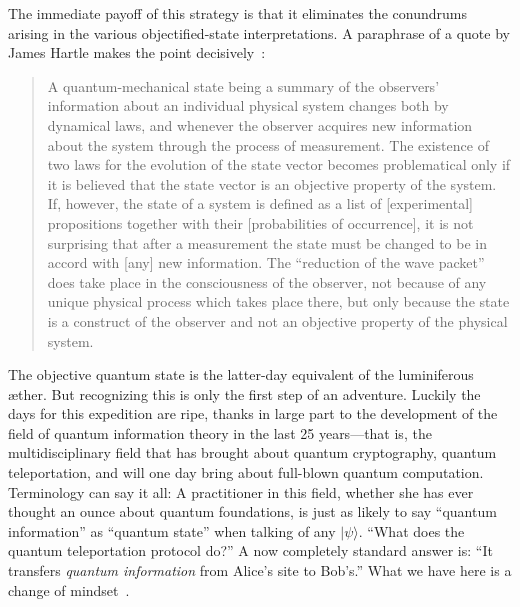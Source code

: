\documentclass[aps,pra,superscriptaddress,12pt,tightenlines,nofootinbib]{revtex4-2}
\begin{document}
The immediate payoff of this strategy is that it eliminates the conundrums arising in the various objectified-state interpretations.  A paraphrase of a quote by James Hartle makes the point decisively~\cite{Hartle68}:
\begin{quote}
\noindent A quantum-mechanical state being a summary of the observers' information about an individual physical system changes both by
dynamical laws, and whenever the observer acquires new information about the system through the process of measurement.  The existence
of two laws for the evolution of the state vector becomes problematical only if it is believed that the state vector is an objective property of the system.   If, however, the state of a system is defined as a list of [experimental] propositions together with their [probabilities of occurrence], it is not surprising that after a measurement the state must be changed to be in accord with [any] new information.  The ``reduction of the wave packet'' does take place in the consciousness of the observer, not because of any unique physical process which takes place there, but only because the state is a construct of the observer and not an objective property of the physical system.
\end{quote}

The objective quantum state is the latter-day equivalent of the
luminiferous {\ae}ther.  But recognizing this is only the first step
of an adventure.  Luckily the days for this expedition are ripe, thanks in large part to the development of the field of quantum information theory in the last 25 years---that is, the multidisciplinary field that has brought about quantum cryptography, quantum teleportation, and will one day bring about full-blown quantum computation.  Terminology can say it all:  A practitioner in this field, whether she has ever thought an ounce about quantum foundations, is just as likely to say ``quantum information'' as ``quantum state'' when talking of any $|\psi\rangle$.  ``What does the quantum teleportation protocol do?''  A now completely standard answer is: ``It transfers {\it quantum information\/} from Alice's site to Bob's.''  What we have here is a change of mindset~\cite{Fuchs10}.
\end{document}
